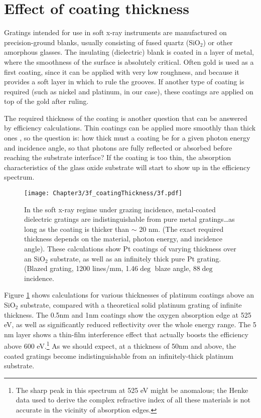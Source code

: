 \section{Effect of coating thickness}
Gratings intended for use in soft x-ray instruments are manufactured on precision-ground  blanks, usually consisting of fused quartz (SiO$_2$) or other amorphous glasses.  The insulating (dielectric) blank is coated in a layer of metal, where the smoothness of the surface is absolutely critical.  Often gold is used as a first coating, since it can be applied with very low roughness, and because it provides a soft layer in which to rule the grooves.  If another type of coating is required (such as nickel and platinum, in our case), these coatings are applied on top of the gold after ruling.

The required thickness of the coating is another question that can be answered by efficiency calculations.   Thin coatings can be applied more smoothly than thick ones \cite{Pea97}, so the question is: how thick must a coating be for a given photon energy and incidence angle, so that photons are fully reflected or absorbed before reaching the substrate interface?  If the coating is too thin, the absorption characteristics of the glass oxide substrate will start to show up in the efficiency spectrum.

\begin{figure}[htbp] %
   \centering
   \texttt{[image: Chapter3/3f\_coatingThickness/3f.pdf]} 
   \caption[In the soft x-ray regime under grazing incidence, metal-coated dielectric gratings are indistinguishable from pure metal gratings\ldots as long as the coating is thicker than $\sim$ 20 nm.]{In the soft x-ray regime under grazing incidence, metal-coated dielectric gratings are indistinguishable from pure metal gratings\ldots as long as the coating is thicker than $\sim$ 20 nm.  (The exact required thickness depends on the material, photon energy, and incidence angle).  These calculations show Pt coatings of varying thickness over an SiO$_2$ substrate, as well as an infinitely thick pure Pt grating.  (Blazed grating, 1200 lines/mm, 1.46$\deg$ blaze angle, 88$\deg$ incidence.}
   \label{3f}
\end{figure}

Figure \ref{3f} shows calculations for various thicknesses of platinum coatings above an SiO$_2$ substrate, compared with a theoretical solid platinum grating of infinite thickness.  The 0.5nm and 1nm coatings show the oxygen absorption edge at 525 eV, as well as significantly reduced reflectivity over the whole energy range.  The 5 nm layer shows a thin-film interference effect that actually boosts the efficiency above 600 eV.\footnote{The sharp peak in this spectrum at 525 eV might be anomalous; the Henke data used to derive the complex refractive index of all these materials is not accurate in the vicinity of absorption edges.}  As we should expect, at a thickness of 50nm and above, the coated gratings become indistinguishable from an infinitely-thick platinum substrate.  

